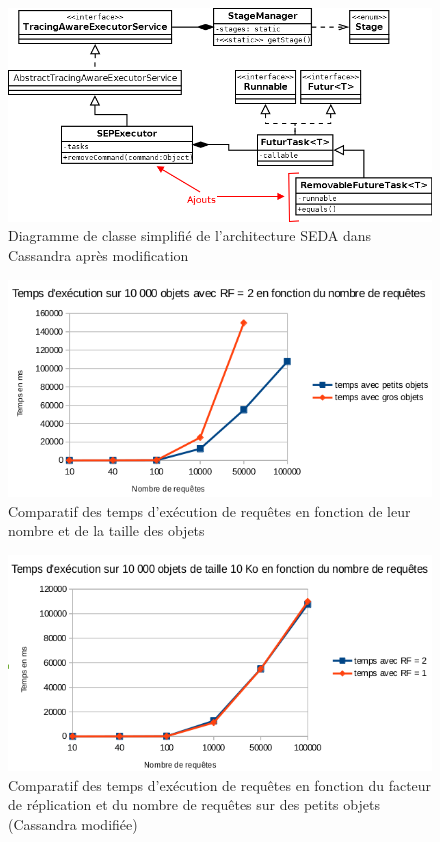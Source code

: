 \documentclass[12pt]{article}
\begin{document}
\begin{figure}[p]
	\centering
		\includegraphics[width=15cm]{images/implementation/stages_diagram_modified.png}
	\caption{Diagramme de classe simplifié de l'architecture SEDA dans Cassandra après modification \label{fig:stages_diagram_modified}}
\end{figure}


\begin{figure}[p]
	\centering
		\includegraphics[width=15cm]{images/tests/PAF-TailleO-RF2.png}
	\caption{Comparatif des temps d'exécution de requêtes en fonction de leur nombre et de la taille des objets \label{fig:test_taille_RF2}}
\end{figure}

\begin{figure}[p]
	\centering
        \includegraphics[width=15cm]{images/tests/PAF-RF-PO.png}
	\caption{Comparatif des temps d'exécution de requêtes en fonction du facteur de réplication et du nombre de requêtes sur des petits objets (Cassandra modifiée) \label{fig:test_RF_PO}}
\end{figure}
\end{document}
